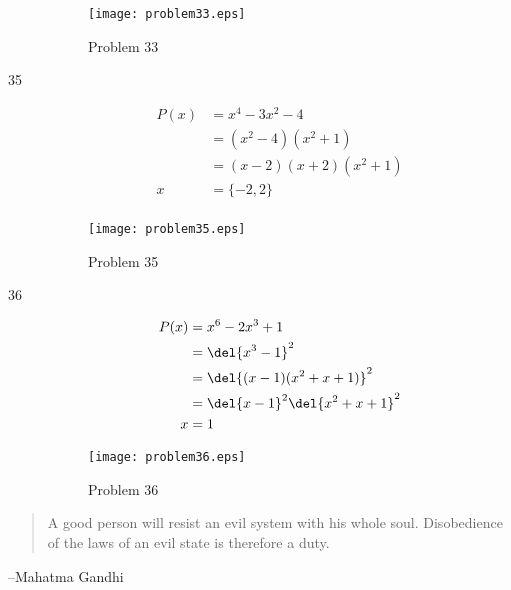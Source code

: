 \documentclass{exam}
\begin{document}
\begin{description}
      \begin{figure}[H]
        \centering
        \texttt{[image: problem33.eps]}
        \caption*{Problem 33}
      \end{figure}

    \item[35] 
      \begin{align*}
        P(x) &= x^4 - 3x^2 - 4 \\
             &= (x^2 - 4)(x^2 + 1) \\
             &= (x - 2)(x + 2)(x^2 + 1) \\
        x    &= \{-2, 2 \} \\
      \end{align*}
      
      \begin{figure}[H]
        \centering
        \texttt{[image: problem35.eps]}
        \caption*{Problem 35}
      \end{figure}

    \item[36] 
      \begin{align*}
        P(x) &= x^6 - 2x^3 + 1 \\
             &= \del{x^3 - 1}^2 \\
             &= \del{(x - 1)(x^2 + x + 1)}^2 \\
             &= \del{x - 1}^2 \del{x^2 + x + 1}^2 \\
        x    &= 1 \\
      \end{align*}
      
      \begin{figure}[H]
        \centering
        \texttt{[image: problem36.eps]}
        \caption*{Problem 36}
      \end{figure}

  \end{description}
\else
  \vspace{9 cm}
  \begin{quote}
    \begin{em}
      A good person will resist an evil system with his whole soul. Disobedience of the laws of an evil state is
      therefore a duty.
    \end{em}
  \end{quote}
  \hspace{1 cm} --Mahatma Gandhi

\fi
\end{document}
